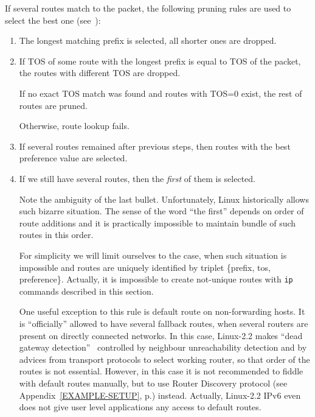 If several routes match to the packet, the following pruning rules
are used to select the best one (see~\cite{RFC1812}):
\begin{enumerate}
\item The longest matching prefix is selected, all shorter ones
are dropped.

\item If TOS of some route with the longest prefix is equal to TOS
of the packet, the routes with different TOS are dropped.

If no exact TOS match was found and routes with TOS=0 exist,
the rest of routes are pruned.

Otherwise, route lookup fails.

\item If several routes remained after previous steps, then
routes with the best preference value are selected.

\item If we still have several routes, then the {\em first\/} of them
is selected.

\begin{NB}
 Note the ambiguity of the last bullet. Unfortunately, Linux
 historically allows such bizarre situation. The sense of the
word ``the first'' depends on order of route additions and it is practically
impossible to maintain bundle of such routes in this order.
\end{NB}

For simplicity we will limit ourselves to the case, when such situation
is impossible and routes are uniquely identified by triplet
\{prefix, tos, preference\}. Actually, it is impossible to create
not-unique routes with \verb|ip| commands described in this section.

One useful exception to this rule is default route on non-forwarding
hosts. It is ``officially'' allowed to have several fallback routes,
when several routers are present on directly connected networks.
In this case, Linux-2.2 makes ``dead gateway detection''~\cite{RFC1122}
controlled by neighbour unreachability detection and by advices
from transport protocols to select working router, so that order
of the routes is not essential. However, in this case it is not recommended
to fiddle with default routes manually, but to use Router Discovery
protocol (see Appendix~\ref{EXAMPLE-SETUP}, p.\pageref{EXAMPLE-SETUP})
instead. Actually, Linux-2.2 IPv6 even does not give user level applications
any access to default routes.
\end{enumerate}

